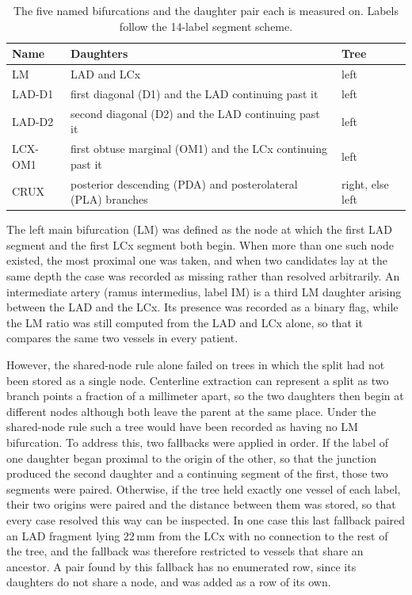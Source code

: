 \begin{table}[htbp]
  \centering
  \caption{The five named bifurcations and the daughter pair each is measured on. Labels follow the 14-label segment scheme.}
  \label{tab:daughter-ratio-named}
  \begin{tabular}{lll}
    \toprule
    Name & Daughters & Tree \\
    \midrule
    LM & LAD and LCx & left \\
    LAD-D1 & first diagonal (D1) and the LAD continuing past it & left \\
    LAD-D2 & second diagonal (D2) and the LAD continuing past it & left \\
    LCX-OM1 & first obtuse marginal (OM1) and the LCx continuing past it & left \\
    CRUX & posterior descending (PDA) and posterolateral (PLA) branches & right, else left \\
    \bottomrule
  \end{tabular}
\end{table}

The left main bifurcation (LM) was defined as the node at which the first LAD segment and the first LCx segment both begin.
When more than one such node existed, the most proximal one was taken, and when two candidates lay at the same depth the case was recorded as missing rather than resolved arbitrarily.
An intermediate artery (ramus intermedius, label IM) is a third LM daughter arising between the LAD and the LCx.
Its presence was recorded as a binary flag, while the LM ratio was still computed from the LAD and LCx alone, so that it compares the same two vessels in every patient.

However, the shared-node rule alone failed on trees in which the split had not been stored as a single node.
Centerline extraction can represent a split as two branch points a fraction of a millimeter apart, so the two daughters then begin at different nodes although both leave the parent at the same place.
Under the shared-node rule such a tree would have been recorded as having no LM bifurcation.
To address this, two fallbacks were applied in order.
If the label of one daughter began proximal to the origin of the other, so that the junction produced the second daughter and a continuing segment of the first, those two segments were paired.
Otherwise, if the tree held exactly one vessel of each label, their two origins were paired and the distance between them was stored, so that every case resolved this way can be inspected.
In one case this last fallback paired an LAD fragment lying 22\,mm from the LCx with no connection to the rest of the tree, and the fallback was therefore restricted to vessels that share an ancestor.
A pair found by this fallback has no enumerated row, since its daughters do not share a node, and was added as a row of its own.

